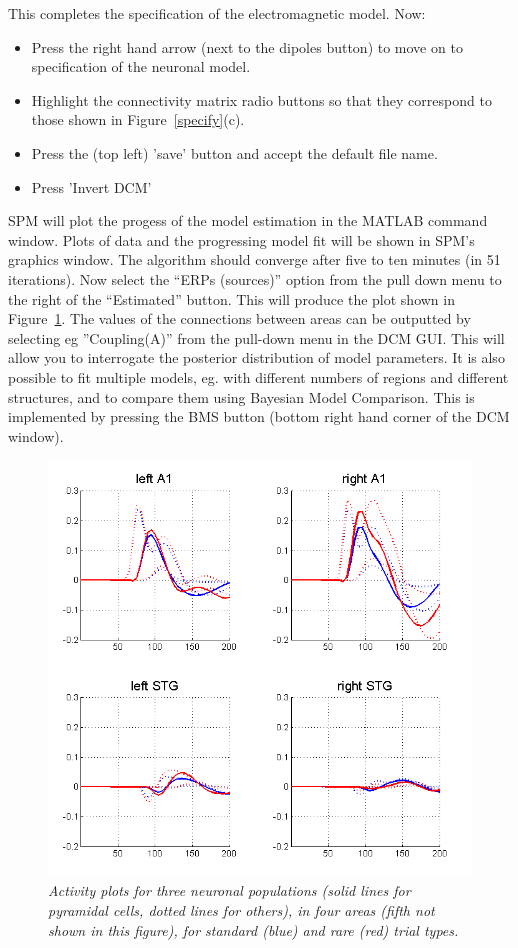 This completes the specification of the electromagnetic model. Now:
\begin{itemize}
\item{Press the right hand arrow (next to the dipoles button) to move on to specification of the neuronal model.}
\item{Highlight the connectivity matrix radio buttons so that they  correspond to those shown in Figure~\ref{specify}(c).}
\item{Press the (top left) 'save' button and accept the default file name.}
\item{Press 'Invert DCM'}
\end{itemize}
SPM will plot the progess of the model estimation in the MATLAB command window. Plots of data and the progressing model fit will be shown in SPM's graphics window. The algorithm should converge after five to ten minutes (in 51 iterations). Now select the ``ERPs (sources)'' option from the pull down menu to the right of the ``Estimated'' button. This will produce the plot shown in Figure~\ref{source_erps}. The values of the connections between areas can be outputted by selecting eg ''Coupling(A)'' from the pull-down menu in the DCM GUI. This will allow you to interrogate the posterior distribution of model parameters. It is also possible to fit multiple models, eg. with different numbers of regions and different structures, and to compare them using Bayesian Model Comparison. This is implemented by pressing the BMS button (bottom right hand corner of the DCM window).

\begin{figure}
\begin{center}
\includegraphics[width=120mm]{mmn/source_erps}
\caption{\em Activity plots for three neuronal populations (solid lines for pyramidal cells, dotted lines for others), in four areas (fifth not shown in this figure), for standard (blue) and rare (red) trial types.
\label{source_erps} }
\end{center}
\end{figure}
